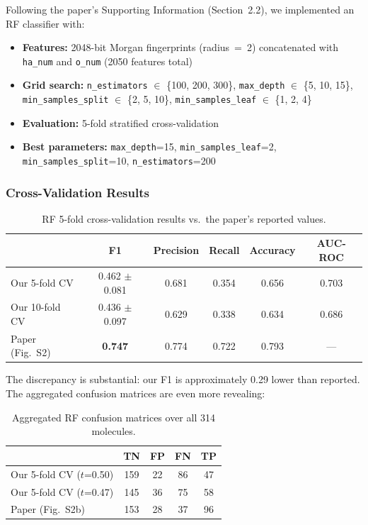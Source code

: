 \documentclass[11pt,a4paper]{article}
\begin{document}
Following the paper's Supporting Information (Section~2.2), we implemented an RF classifier with:
\begin{itemize}[nosep]
    \item \textbf{Features:} 2048-bit Morgan fingerprints (radius~=~2) concatenated with \texttt{ha\_num} and \texttt{o\_num} (2050 features total)
    \item \textbf{Grid search:} \texttt{n\_estimators} $\in$ \{100, 200, 300\}, \texttt{max\_depth} $\in$ \{5, 10, 15\}, \texttt{min\_samples\_split} $\in$ \{2, 5, 10\}, \texttt{min\_samples\_leaf} $\in$ \{1, 2, 4\}
    \item \textbf{Evaluation:} 5-fold stratified cross-validation
    \item \textbf{Best parameters:} \texttt{max\_depth}=15, \texttt{min\_samples\_leaf}=2, \texttt{min\_samples\_split}=10, \texttt{n\_estimators}=200
\end{itemize}

\subsubsection{Cross-Validation Results}

\begin{table}[H]
\centering
\caption{RF 5-fold cross-validation results vs.\ the paper's reported values.}
\label{tab:rf_cv}
\begin{tabular}{lccccc}
\toprule
 & F1 & Precision & Recall & Accuracy & AUC-ROC \\
\midrule
Our 5-fold CV & 0.462 $\pm$ 0.081 & 0.681 & 0.354 & 0.656 & 0.703 \\
Our 10-fold CV & 0.436 $\pm$ 0.097 & 0.629 & 0.338 & 0.634 & 0.686 \\
\rowcolor{lightyellow}
Paper (Fig.~S2) & \textbf{0.747} & 0.774 & 0.722 & 0.793 & --- \\
\bottomrule
\end{tabular}
\end{table}

The discrepancy is substantial: our F1 is approximately 0.29 lower than reported. The aggregated confusion matrices are even more revealing:

\begin{table}[H]
\centering
\caption{Aggregated RF confusion matrices over all 314 molecules.}
\label{tab:rf_cm}
\begin{tabular}{lcccc}
\toprule
 & TN & FP & FN & TP \\
\midrule
Our 5-fold CV ($t$=0.50) & 159 & 22 & 86 & 47 \\
Our 5-fold CV ($t$=0.47) & 145 & 36 & 75 & 58 \\
\rowcolor{lightyellow}
Paper (Fig.~S2b) & 153 & 28 & 37 & 96 \\
\bottomrule
\end{tabular}
\end{table}
\end{document}
